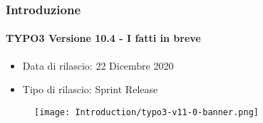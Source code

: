 %

\begin{frame}[fragile]
	\frametitle{Introduzione}
	\framesubtitle{TYPO3 Versione 10.4 - I fatti in breve}

	\begin{itemize}
		\item Data di rilascio: 22 Dicembre 2020
		\item Tipo di rilascio: Sprint Release
	\end{itemize}

	\begin{figure}
		\texttt{[image: Introduction/typo3-v11-0-banner.png]}
	\end{figure}

\end{frame}

